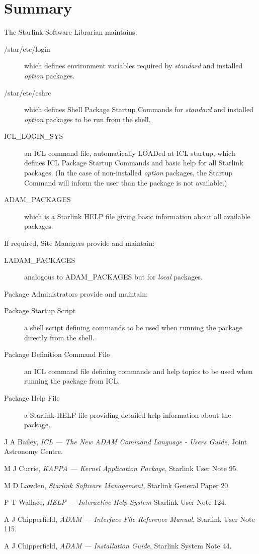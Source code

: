 \documentclass[twoside,11pt,nolof]{starlink}
\begin{document}
\normalsize

\section{Summary}
The Starlink Software Librarian maintains:
\begin{description}
\item[/star/etc/login] which defines environment variables required by
\textit{standard} and installed \textit{option} packages.
\item[/star/etc/cshrc] which defines Shell Package Startup Commands for
\textit{standard} and installed \textit{option} packages to be run from the shell.
\item[ICL\_LOGIN\_SYS] an ICL command file, automatically LOADed at ICL startup,
which defines ICL Package Startup Commands and basic help for all Starlink
packages. (In the case of non-installed \textit{option} packages, the Startup
Command will inform the user than the package is not available.)
\item[ADAM\_PACKAGES] which is a Starlink HELP file giving basic information
about all available packages.
\end{description}
If required, Site Managers provide and maintain:
\begin{description}
\item[LADAM\_PACKAGES] analogous to ADAM\_PACKAGES but for \textit{local} packages.
\end{description}
Package Administrators provide and maintain:
\begin{description}
\item[Package Startup Script] a shell script defining commands to be used when
running the package directly from the shell.
\item[Package Definition Command File] an ICL command file defining commands
and help topics to be used when running the package from ICL.
\item[Package Help File] a Starlink HELP file providing detailed help
information about the package.
\end{description}

\begin{thebibliography}{99}
J A Bailey, \textit{ICL --- The New ADAM Command Language - Users Guide}, Joint Astronomy Centre.

 M J Currie, \textit{KAPPA --- Kernel Application Package}, Starlink User Note 95.

M D Lawden, \textit{Starlink Software Management}, Starlink General Paper 20.


 P T Wallace, \textit{HELP --- Interactive Help System}
Starlink User Note 124.

 A J Chipperfield, \textit{ADAM --- Interface File Reference Manual},
Starlink User Note 115.

 A J Chipperfield, \textit{ADAM --- Installation Guide}, Starlink
System Note 44.
\end{thebibliography}
\end{document}
